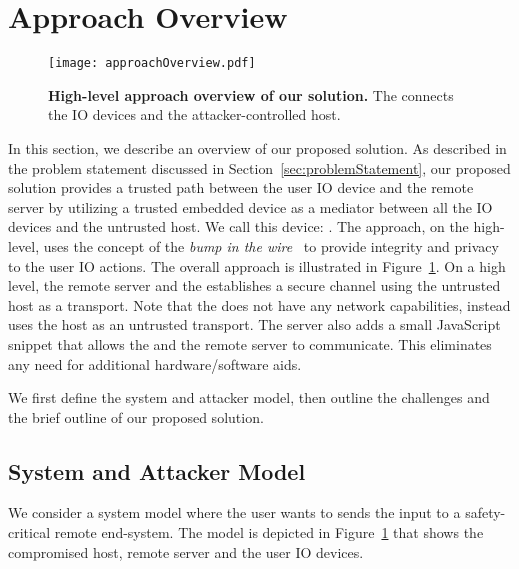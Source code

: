 \section{\name Approach Overview}
\label{sec:approach}


\begin{figure}[t]
\centering
\texttt{[image: approachOverview.pdf]}
\caption{\textbf{High-level approach overview of our solution.}  The \device connects the IO devices and the attacker-controlled host. }
\label{fig:approachOverview}
\centering
\end{figure}


In this section, we describe an overview of our proposed solution. As described in the problem statement discussed in Section~\ref{sec:problemStatement}, our proposed solution provides a trusted path between the user IO device and the remote server by utilizing a trusted embedded device as a mediator between all the IO devices and the untrusted host. We call this device: \device. The approach, on the high-level, uses the concept of the \emph{bump in the wire}~\cite{McCPerRei2006} to provide integrity and privacy to the user IO actions. The overall approach is illustrated in Figure~\ref{fig:approachOverview}. On a high level, the remote server and the \device establishes a secure channel using the untrusted host as a transport. Note that the \device does not have any network capabilities, instead uses the host as an untrusted transport. The server also adds a small JavaScript snippet that allows the \device and the remote server to communicate. This eliminates any need for additional hardware/software aids.

We first define the system and attacker model, then outline the challenges and the brief outline of our proposed solution.



\subsection{System and Attacker Model}

We consider a system model where the user wants to sends the input to a safety-critical remote end-system. The model is depicted in Figure~\ref{fig:approachOverview} that shows the compromised host, remote server and the user IO devices. 

